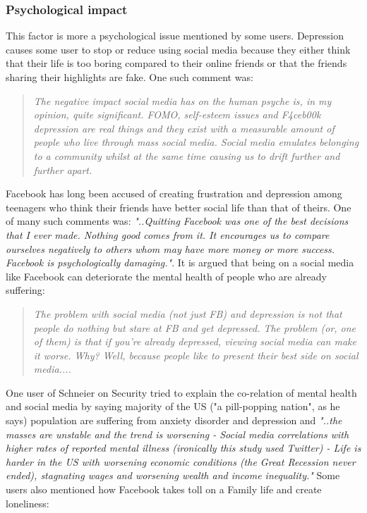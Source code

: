  \subsubsection{Psychological impact}
 This factor is more a psychological issue mentioned by some users. Depression causes some user to stop or reduce using social media because they either think that their life is too boring compared to their online friends or that the friends sharing their highlights are fake. One such comment was:
     \begin{quote}
         \textit{The negative impact social media has on the human psyche is, in my opinion, quite significant. FOMO, self-esteem issues and F4ceb00k depression are real things and they exist with a measurable amount of people who live through mass social media. Social media emulates belonging to a community whilst at the same time causing us to drift further and further apart.}
     \end{quote}
    
    Facebook has long been accused of creating frustration and depression among teenagers who think their friends have better social life than that of theirs. One of many such comments was: \textit{"..Quitting Facebook was one of the best decisions that I ever made. Nothing good comes from it. It encourages us to compare ourselves negatively to others whom may have more money or more success. Facebook is psychologically damaging."}. It is argued that being on a social media like Facebook can deteriorate the mental health of people who are already suffering:
    \begin{quote}
         \textit{The problem with social media (not just FB) and depression is not that people do nothing but stare at FB and get depressed. The problem (or, one of them) is that if you're already depressed, viewing social media can make it worse. Why? Well, because people like to present their best side on social media.... }
    \end{quote}
    
    One user of Schneier on Security tried to explain the co-relation of mental health and social media by saying majority of the US ("a pill-popping nation", as he says) population are suffering from anxiety disorder and depression and \textit{"..the masses are unstable and the trend is worsening - Social media correlations with higher rates of reported mental illness (ironically this study used Twitter) - Life is harder in the US with worsening economic conditions (the Great Recession never ended), stagnating wages and worsening wealth and income inequality."} Some users also mentioned how Facebook takes toll on a Family life and create loneliness:
    
